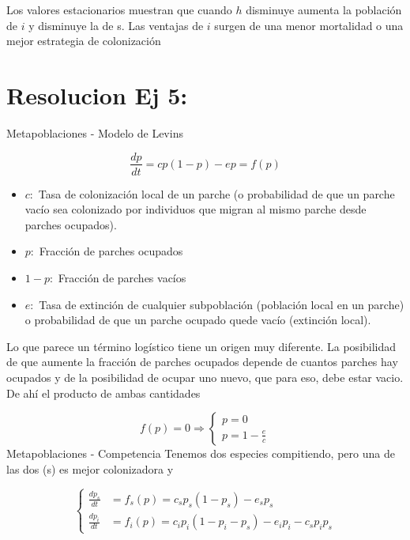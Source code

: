 \documentclass[twocolumn,aps,prl]{revtex4-1}
\begin{document}
Los valores estacionarios muestran que cuando $h$ disminuye aumenta la población de $i $ y disminuye la de s. Las ventajas de $i$ surgen de una menor mortalidad o una mejor estrategia de colonización

% 
%                             
% 

\section{Resolucion Ej 5:}

Metapoblaciones - Modelo de Levins


$$\frac{d p}{d t}=c p(1-p)-e p = f(p)$$

\begin{itemize}
    \item $c:$ Tasa de colonización local de un parche (o probabilidad de que un parche vacío sea colonizado por individuos que migran al mismo parche desde parches ocupados). 
    \item $p:$ Fracción de parches ocupados
    \item $1-p:$ Fracción de parches vacíos
    \item $e:$ Tasa de extinción de cualquier subpoblación (población local en un parche) o probabilidad de que un parche ocupado quede vacío (extinción local).
\end{itemize}

Lo que parece un término logístico tiene un origen muy diferente. La posibilidad de que aumente la fracción de parches ocupados depende de cuantos parches hay ocupados y de la posibilidad de ocupar uno nuevo, que para eso, debe estar vacio. De ahí el producto de ambas cantidades

$$
f(p) = 0 \Rightarrow\left\{
\begin{array}{l}
    p=0 \\ 
    p=1-\frac{e}{c}
\end{array}
\right.
$$
Metapoblaciones - Competencia
Tenemos dos especies compitiendo, pero una de las dos (s) es mejor colonizadora y

$$
\left\{
\begin{aligned}
    \frac{d p_{s}}{d t} &=f_{s}(p)=c_{s} p_{s}\left(1-p_{s}\right)-e_{s} p_{s} \\ 
    \frac{d p_{i}}{d t} &=f_{i}(p)=c_{i} p_{i}\left(1-p_{i}-p_{s}\right)-e_{i} p_{i}-c_{s} p_{i} p_{s}
\end{aligned} 
\right.
$$
\end{document}
